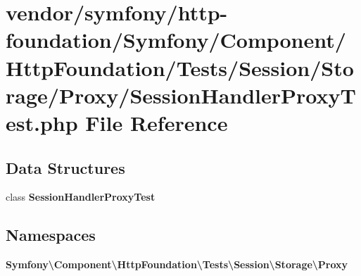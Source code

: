 \section{vendor/symfony/http-\/foundation/\+Symfony/\+Component/\+Http\+Foundation/\+Tests/\+Session/\+Storage/\+Proxy/\+Session\+Handler\+Proxy\+Test.php File Reference}
\label{_session_handler_proxy_test_8php}
\subsection*{Data Structures}
\begin{DoxyCompactItemize}
\item 
class {\bf Session\+Handler\+Proxy\+Test}
\end{DoxyCompactItemize}
\subsection*{Namespaces}
\begin{DoxyCompactItemize}
\item 
 {\bf Symfony\textbackslash{}\+Component\textbackslash{}\+Http\+Foundation\textbackslash{}\+Tests\textbackslash{}\+Session\textbackslash{}\+Storage\textbackslash{}\+Proxy}
\end{DoxyCompactItemize}
